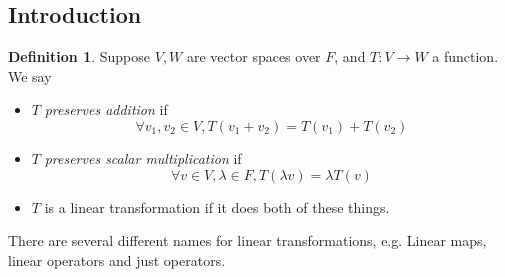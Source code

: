 \documentclass{report}
\theoremstyle{remark}
\theoremstyle{definition}
\newtheorem{definition}[theorem]{Definition}
\theoremstyle{definition}
\theoremstyle{theorem}
\begin{document}
\subsection{Introduction}
\begin{definition}
Suppose $V,W$ are vector spaces over $F$, and $T: V \rightarrow W$ a function. We say
\begin{itemize}
    \item $T$ \emph{preserves addition} if
    \[\forall v_1, v_2 \in V, T(v_1 + v_2) = T(v_1) + T(v_2)\]
    \item $T$ \emph{preserves scalar multiplication} if
    \[\forall v \in V, \lambda \in F, T(\lambda v) = \lambda T(v)\]
    \item $T$ is a linear transformation if it does both of these things.
\end{itemize}
\end{definition}
There are several different names for linear transformations, e.g. Linear maps, linear operators and just operators.
\end{document}
